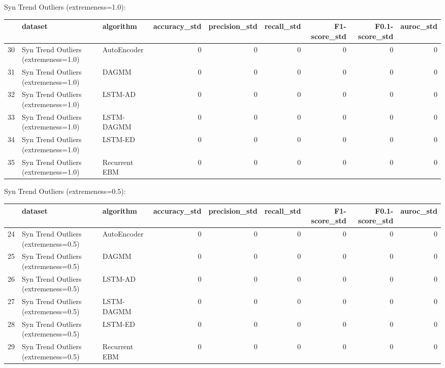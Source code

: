 Syn Trend Outliers (extremeness=1.0):

\begin{tabular}{rllrrrrrr}
\hline
    & dataset                              & algorithm     &   accuracy\_std &   precision\_std &   recall\_std &   F1-score\_std &   F0.1-score\_std &   auroc\_std \\
\hline
 30 & Syn Trend Outliers (extremeness=1.0) & AutoEncoder   &              0 &               0 &            0 &              0 &                0 &           0 \\
 31 & Syn Trend Outliers (extremeness=1.0) & DAGMM         &              0 &               0 &            0 &              0 &                0 &           0 \\
 32 & Syn Trend Outliers (extremeness=1.0) & LSTM-AD       &              0 &               0 &            0 &              0 &                0 &           0 \\
 33 & Syn Trend Outliers (extremeness=1.0) & LSTM-DAGMM    &              0 &               0 &            0 &              0 &                0 &           0 \\
 34 & Syn Trend Outliers (extremeness=1.0) & LSTM-ED       &              0 &               0 &            0 &              0 &                0 &           0 \\
 35 & Syn Trend Outliers (extremeness=1.0) & Recurrent EBM &              0 &               0 &            0 &              0 &                0 &           0 \\
\hline
\end{tabular}

Syn Trend Outliers (extremeness=0.5):

\begin{tabular}{rllrrrrrr}
\hline
    & dataset                              & algorithm     &   accuracy\_std &   precision\_std &   recall\_std &   F1-score\_std &   F0.1-score\_std &   auroc\_std \\
\hline
 24 & Syn Trend Outliers (extremeness=0.5) & AutoEncoder   &              0 &               0 &            0 &              0 &                0 &           0 \\
 25 & Syn Trend Outliers (extremeness=0.5) & DAGMM         &              0 &               0 &            0 &              0 &                0 &           0 \\
 26 & Syn Trend Outliers (extremeness=0.5) & LSTM-AD       &              0 &               0 &            0 &              0 &                0 &           0 \\
 27 & Syn Trend Outliers (extremeness=0.5) & LSTM-DAGMM    &              0 &               0 &            0 &              0 &                0 &           0 \\
 28 & Syn Trend Outliers (extremeness=0.5) & LSTM-ED       &              0 &               0 &            0 &              0 &                0 &           0 \\
 29 & Syn Trend Outliers (extremeness=0.5) & Recurrent EBM &              0 &               0 &            0 &              0 &                0 &           0 \\
\hline
\end{tabular}

